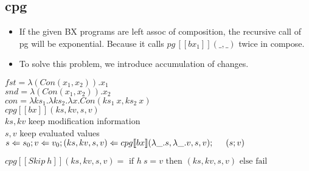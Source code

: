 \documentclass[runningheads]{llncs}
\newcommand{\tab}{\hspace*{5mm}}
\newcommand{\pg}[3]{pg \, [\![#1]\!] (#2, #3)}
\newcommand{\cpg}[5]{cpg [\![#1]\!] (#2, #3, #4, #5)}
\begin{document}

\subsection{cpg}

\begin{itemize}
\item If the given BX programs are left assoc of composition, the recursive call of pg will be exponential. Because it calls $\pg{bx_1}{\_}{\_}$ twice in compose.
\item To solve this problem, we introduce accumulation of changes.
\end{itemize}

$fst = \lambda (Con (x_1, x_2)). x_1$\\
$snd = \lambda (Con (x_1, x_2)). x_2$\\
$con = \lambda ks_1. \lambda ks_2. \lambda x. Con(ks_1 \ x, ks_2 \ x)$\\

$\cpg{bx}{ks}{kv}{s}{v}$ \\
    \tab $ks, kv$ keep modification information\\
    \tab $s, v$ keep evaluated values\\

\textcolor{red}{
    $s \Leftarrow s_0; v \Leftarrow v_0;\\
    (ks, kv, s, v) \Leftarrow \cpg{bx}{\lambda \_.s}{\lambda \_.v}{s}{v};\\
        \tab (s; v)$
}

\vspace{3mm}

$\cpg{Skip \ h}{ks}{kv}{s}{v} = \text{ if } h \ s = v \text{ then } (ks, kv, s, v) \text{ else fail}$\\
\end{document}
